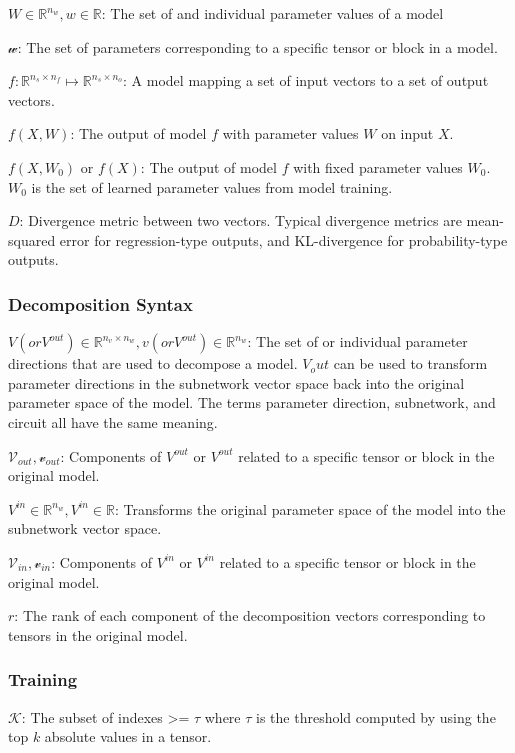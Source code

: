 \documentclass{article}
\theoremstyle{plain}
\theoremstyle{definition}
\theoremstyle{remark}
\begin{document}
$W \in \mathbb{R}^{n_w}, w \in \mathbb{R}$: The set of and individual parameter values of a model

$\mathcal{w}$: The set of parameters corresponding to a specific tensor or block in a model.

$f: \mathbb{R}^{n_s \times n_f} \mapsto \mathbb{R}^{n_s \times n_o}$: A model mapping a set of input vectors to a set of output vectors.

$f(X, W)$: The output of model $f$ with parameter values $W$ on input $X$.

$f(X, W_0)$ or $f(X)$: The output of model $f$ with fixed parameter values $W_0 $. $W_0$ is the set of learned parameter values from model training.

$D$: Divergence metric between two vectors. Typical divergence metrics are mean-squared error for regression-type outputs, and KL-divergence for probability-type outputs. 

\subsubsection{Decomposition Syntax}
$V (or V^{out}) \in \mathbb{R}^{n_v \times n_w}, v (or V^{out})  \in \mathbb{R}^{n_w}$: The set of or individual parameter directions that are used to decompose a model. $V_out$ can be used to transform parameter directions in the subnetwork vector space back into the original parameter space of the model. The terms parameter direction, subnetwork, and circuit all have the same meaning. 

$\mathcal{V}_{out}, \mathcal{v}_{out}$: Components of $V^{out}$ or $V^{out}$ related to a specific tensor or block in the original model. 

$V^{in} \in \mathbb{R}^{n_w}, V^{in} \in \mathbb{R}$: Transforms the original parameter space of the model into the subnetwork vector space. 

$\mathcal{V}_{in}, \mathcal{v}_{in}$: Components of $V^{in}$ or $V^{in}$ related to a specific tensor or block in the original model. 

$r$: The rank of each component of the decomposition vectors corresponding to tensors in the original model. 

\subsubsection{Training}

$\mathcal{K}$: The subset of indexes >= $\tau$ where $\tau$ is the threshold computed by using the top $k$ absolute values in a tensor. 
\end{document}

